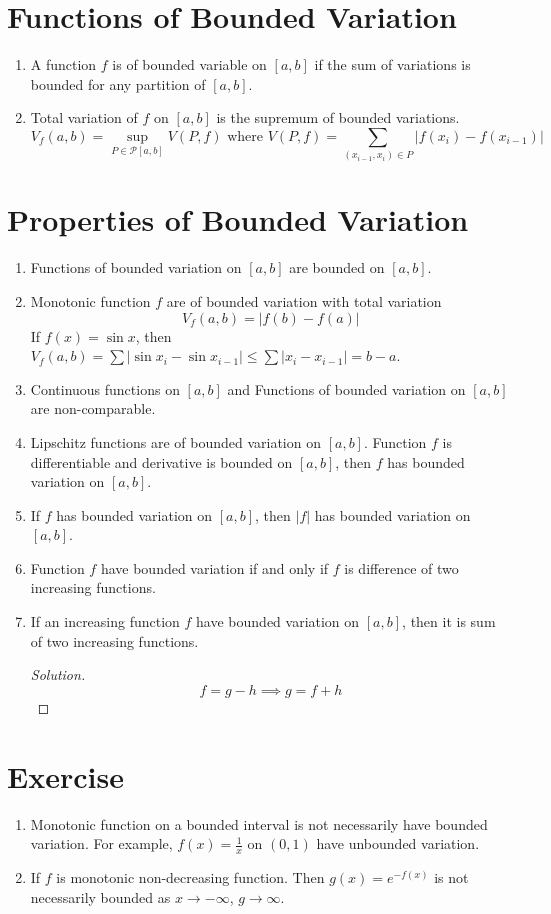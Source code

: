 \section{Functions of Bounded Variation}
\begin{enumerate}
	\item A function $f$ is of bounded variable on $[a,b]$ if the sum of variations is bounded for any partition of $[a,b]$.
	\item Total variation of $f$ on $[a,b]$ is the supremum of bounded variations.
		$$ V_f(a,b) = \sup_{P \in \mathscr{P}[a,b]} \!\!\! V(P,f) \text{ where } V(P,f) = \!\!\!\!\!\! \sum_{(x_{i-1},x_i) \in P}\!\!\!\!\!\! |f(x_i) - f(x_{i-1})| $$
\end{enumerate}

\section{Properties of Bounded Variation}
\begin{enumerate}
	\item Functions of bounded variation on $[a,b]$ are bounded on $[a,b]$.
	\item Monotonic function $f$ are of bounded variation with total variation 
		$$ V_f(a,b) = |f(b)-f(a)| $$
		\subitem If $f(x) = \sin x$, then $V_f(a,b) = \sum |\sin x_i - \sin x_{i-1}| \le \sum |x_i - x_{i-1}| = b-a$.
	\item Continuous functions on $[a,b]$ and Functions of bounded variation on $[a,b]$ are non-comparable.
	\item Lipschitz functions are of bounded variation on $[a,b]$.
		\subitem Function $f$ is differentiable and derivative is bounded on $[a,b]$, then $f$ has bounded variation on $[a,b]$.
	\item If $f$ has bounded variation on $[a,b]$, then $|f|$ has bounded variation on $[a,b]$.
	\item Function $f$ have bounded variation if and only if $f$ is difference of two increasing functions.
	\item If an increasing function $f$ have bounded variation on $[a,b]$, then it is sum of two increasing functions.
	\begin{proof}[Solution]
		$$ f = g-h \implies g = f+h $$
	\end{proof}
\end{enumerate}

\section{Exercise}
\begin{enumerate}
	\item Monotonic function on a bounded interval is not necessarily have bounded variation. For example, $f(x) = \frac{1}{x}$ on $(0,1)$ have unbounded variation.
	\item If $f$ is monotonic non-decreasing function. Then $g(x) = e^{-f(x)}$ is not necessarily bounded as $x \to -\infty$, $g \to \infty$.
\end{enumerate}

